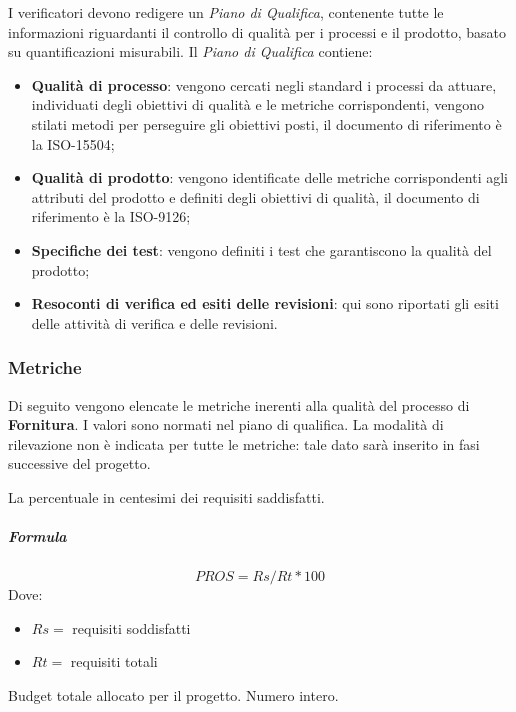 			I verificatori devono redigere un \textit{Piano di Qualifica}, contenente tutte le informazioni riguardanti il controllo di qualità  per i processi e il prodotto, basato su quantificazioni misurabili. Il \textit{Piano di Qualifica} contiene:
			\begin{itemize}
			    \item \textbf{Qualità di processo}: vengono cercati negli standard i processi da attuare, individuati degli obiettivi di qualità e le metriche corrispondenti, vengono stilati metodi per perseguire gli obiettivi posti, il documento di riferimento è la ISO-15504;
			    \item \textbf{Qualità di prodotto}: vengono identificate delle metriche corrispondenti agli attributi del prodotto e definiti degli obiettivi di qualità, il documento di riferimento è la ISO-9126;
			    \item \textbf{Specifiche dei test}: vengono definiti i test che garantiscono la qualità del prodotto;
			    \item \textbf{Resoconti di verifica ed esiti delle revisioni}: qui sono riportati gli esiti delle attività di verifica e delle revisioni.
			\end{itemize}
		\subsubsection{Metriche}
        Di seguito vengono elencate le metriche inerenti alla qualità del processo di \textbf{Fornitura}. I valori sono normati nel piano di qualifica. La modalità di rilevazione non è indicata per tutte le metriche: tale dato sarà 
        inserito in fasi successive del progetto.
        
        La percentuale in centesimi dei requisiti saddisfatti.
        \subparagraph{Formula}
        \begin{displaymath}
         PROS = Rs / Rt *100
        \end{displaymath}
        Dove:
        \begin{itemize}
            \item[] $Rs =$ requisiti soddisfatti
            \item[] $Rt =$ requisiti totali
        \end{itemize}
        
        Budget totale allocato per il progetto.
         Numero intero.
        
